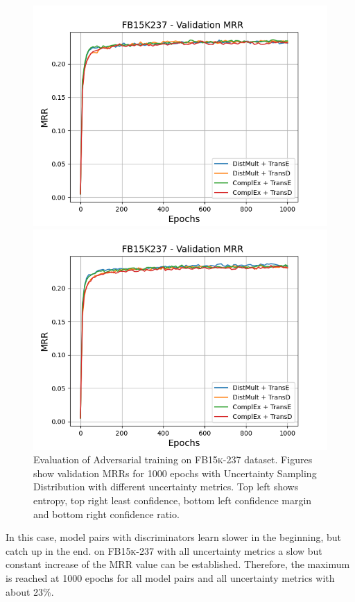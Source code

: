 \begin{figure}[H]
\begin{minipage}{.5\textwidth}
    \end{minipage}
    \begin{minipage}{.5\textwidth}
      \centering
      \includegraphics[width=0.9\linewidth]{figures/results/gan_train/not_pretrained/uncertainty/max_distribution/confidence_margin/fb15k237/uncertainty_fb15k237_mrrs.png}
    \end{minipage}%
    \begin{minipage}{.5\textwidth}
      \centering
      \includegraphics[width=0.9\linewidth]{figures/results/gan_train/not_pretrained/uncertainty/max_distribution/confidence_ratio/fb15k237/uncertainty_fb15k237_mrrs.png}
    \end{minipage}%
    \caption{Evaluation of Adversarial training on \textsc{FB15k-237} dataset. 
    Figures show validation MRRs for 1000 epochs with Uncertainty Sampling Distribution with different uncertainty metrics.
    Top left shows entropy, top right least confidence, 
    bottom left confidence margin and bottom right confidence ratio.}
    \label{fig:advtrain_measures_fb15k237}
\end{figure}
In this case, model pairs with \transd discriminators learn slower in the beginning, but catch up in the end.
on \textsc{FB15k-237} with all uncertainty metrics a slow but constant increase of the MRR value can be established.
Therefore, the maximum is reached at 1000 epochs for all model pairs and all uncertainty metrics with about 23\%.



